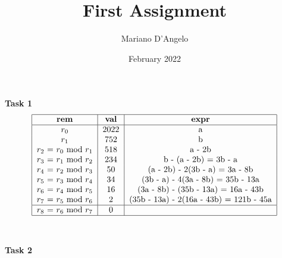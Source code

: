 \documentclass[12pt, letterpaper, twoside]{article}
\title{First Assignment}
\author{Mariano D'Angelo}
\date{February 2022}
\begin{document}
\maketitle

\textbf{Task 1}
\begin{equation}
\begin{tabular}{ | c | c | c | } \hline
    \textbf{rem} & \textbf{val} & \textbf{expr} \\ \hline
    $r_0$ & 2022 & a \\
    $r_1$ & 752 & b \\
    $r_2$ = $r_0$ mod $r_1$ & 518 & a - 2b \\
    $r_3$ = $r_1$ mod $r_2$ & 234 & b - (a - 2b) = 3b - a \\
    $r_4$ = $r_2$ mod $r_3$ & 50 & (a - 2b) - 2(3b - a) = 3a - 8b \\
    $r_5$ = $r_3$ mod $r_4$ & 34 & (3b - a) - 4(3a - 8b) = 35b - 13a \\
    $r_6$ = $r_4$ mod $r_5$ & 16 & (3a - 8b) - (35b - 13a) = 16a - 43b \\
    $r_7$ = $r_5$ mod $r_6$ & 2 & (35b - 13a) - 2(16a - 43b) = 121b - 45a \\ \hline
    $r_8$ = $r_6$ mod $r_7$ & 0 & \\ \hline
\end{tabular}
\end{equation}
\\ \\
\textbf{Task 2}
\end{document}
